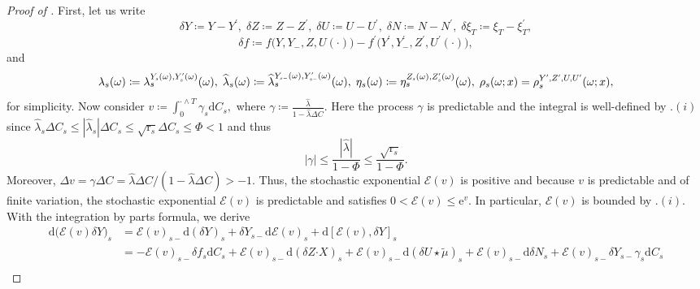 \documentclass[10pt]{article} %
\newcommand\cE{\mathcal E}
\newcommand{\smalltext}[1]{\text{\fontsize{4}{4}\selectfont$#1$}}
\newcommand{\bcdot}{\boldsymbol{\cdot}}
\newcommand{\1}{\mathbf{1}}
\def\d{\mathrm{d}}
\begin{document}
\begin{proof}[Proof of ]
	First, let us write 
	\begin{equation*}
		\delta Y \coloneqq Y-Y^\prime, \; \delta Z \coloneqq Z-Z^\prime, \; \delta U \coloneqq U - U^\prime, \; \delta N \coloneqq N - N^\prime, \; \delta \xi_T \coloneqq \xi_T - \xi^\prime_T,
	\end{equation*}
	\begin{equation*}
		\delta f \coloneqq f\big(Y,Y_-,Z,U(\cdot)) - f^\prime\big(Y^\prime,Y^\prime_-,Z^\prime,U^\prime(\cdot)\big),
	\end{equation*}
	and
	\begin{equation*}
		\lambda_s(\omega) \coloneqq \lambda^{Y_\smalltext{s}(\omega),Y^\smalltext{\prime}_\smalltext{s}(\omega)}_s(\omega), 
		\; \widehat\lambda_s(\omega) \coloneqq \widehat\lambda^{Y_{\smalltext{s}\smalltext{-}}(\omega),Y^\smalltext{\prime}_{\smalltext{s}\smalltext{-}}(\omega)}_s(\omega), 
		\; \eta_s(\omega) \coloneqq \eta^{Z_\smalltext{s}(\omega),Z^\smalltext{\prime}_\smalltext{s}(\omega)}_s(\omega),
		\; \rho_s(\omega;x) = \rho^{Y^\smalltext{\prime},Z^\smalltext{\prime},U,U^\smalltext{\prime}}_s(\omega;x),
	\end{equation*}
	for simplicity. Now consider $v \coloneqq \int_0^{\cdot \land T} \gamma_s \d C_s,$ where  $\gamma \coloneqq \frac{\widehat\lambda}{1-\widehat\lambda\Delta C}.$ Here the process $\gamma$ is predictable and the integral is well-defined by .$(i)$ since $\widehat\lambda_s \Delta C_s \leq |\widehat\lambda_s| \Delta C_s \leq \sqrt{\mathrm{r}_s}\Delta C_s \leq \Phi < 1 $ and thus
	\begin{equation*}
		|\gamma| \leq \frac{|\widehat\lambda|}{1-\Phi} \leq \frac{\sqrt{\mathrm{r}_s}}{1-\Phi}.
	\end{equation*}
	Moreover, $\Delta v = \gamma\Delta C = \widehat\lambda\Delta C/(1-\widehat\lambda\Delta C) > -1$. Thus, the stochastic exponential $\cE(v)$ is positive and because $v$ is predictable and of finite variation, the stochastic exponential $\cE(v)$ is predictable and satisfies $0 < \cE(v) \leq \mathrm{e}^{v}$. In particular, $\cE(v)$ is bounded by .$(i)$.	With the integration by parts formula, we derive
	\begin{align}\label{eq::ito_comparison}
		\d \big(\cE(v)\delta Y\big)_s &= \cE(v)_{s-}\d (\delta Y)_s + \delta Y_{s-} \d \cE(v)_s + \d [\cE(v),\delta Y]_s \nonumber\\
		&= -\cE(v)_{s-} \delta f_s \d C_s + \cE(v)_{s-} \d(\delta Z \bcdot X)_s + \cE(v)_{s-}\d (\delta U \star\tilde\mu)_s + \cE(v)_{s-}\d \delta N_s + \cE(v)_{s-}\delta Y_{s-}\gamma_s\d C_s \nonumber\\

\end{align}
\end{proof}
\end{document}
